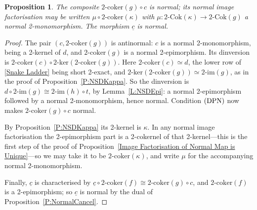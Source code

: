 \documentclass[reqno,a4paper]{amsart}
\numberwithin{equation}{section}
\theoremstyle{plain}
\newtheorem{proposition}[subsection]{Proposition}
\theoremstyle{definition}
\def\nameit#1{\textrm{#1}~}
\def\prox{\nameit{Proposition}}
\def\lemx{\nameit{Lemma}}
\newcommand{\comp}{\circ}
\newcommand{\iso}{\cong}
\renewcommand{\1}{\onecat{1}}
\newcommand{\DPN}{\textup{(DPN)}}
\newcommand{\TwoCoker}{\ensuremath{2\text{-}\mathrm{Cok}}}
\newcommand{\twoker}{\ensuremath{2\text{-}\mathrm{ker}}}
\newcommand{\twocoker}{\ensuremath{2\text{-}\mathrm{coker}}}
\newcommand{\twoimg}{\ensuremath{2\text{-}\mathrm{im}}}
\begin{document}
\begin{proposition}\label{P:NSDcbar}
	The composite \(\twocoker(g)\comp c\) is normal; its normal image factorisation may be written \(\mu\comp\twocoker(\kappa)\) with \(\mu\colon\TwoCoker(\kappa)\to\TwoCoker(g)\) a normal 2-monomorphism. The morphism \(\underline{c}\) is normal.
\end{proposition}
\begin{proof}
	The pair \((c,\twocoker(g))\) is antinormal: \(c\) is a normal 2-monomorphism, being a 2-kernel of \(d\), and \(\twocoker(g)\) is a normal 2-epimorphism. Its dinversion is \(\twocoker(c)\comp\twoker(\twocoker(g))\). Here \(\twocoker(c)\simeq d\), the lower row of \eqref{Snake Ladder} being short 2-exact, and \(\twoker(\twocoker(g))\simeq\twoimg(g)\), as in the proof of \prox\ref{P:NSDKappa}. So the dinversion is \(d\comp\twoimg(g)\iso\twoimg(h)\comp t\), by \lemx\ref{L:NSDEpi}: a normal 2-epimorphism followed by a normal 2-monomorphism, hence normal. Condition \(\DPN\) now makes \(\twocoker(g)\comp c\) normal.

	By \prox\ref{P:NSDKappa} its 2-kernel is \(\kappa\). In any normal image factorisation the 2-epimorphism part is a 2-cokernel of that 2-kernel---this is the first step of the proof of \prox\ref{Image Factorisation of Normal Map is Unique}---so we may take it to be \(\twocoker(\kappa)\), and write \(\mu\) for the accompanying normal 2-monomorphism.

	Finally, \(\underline{c}\) is characterised by \(\underline{c}\comp\twocoker(f)\iso\twocoker(g)\comp c\), and \(\twocoker(f)\) is a 2-epimorphism; so \(\underline{c}\) is normal by the dual of \prox\ref{P:NormalCancel}.
\end{proof}
\end{document}
